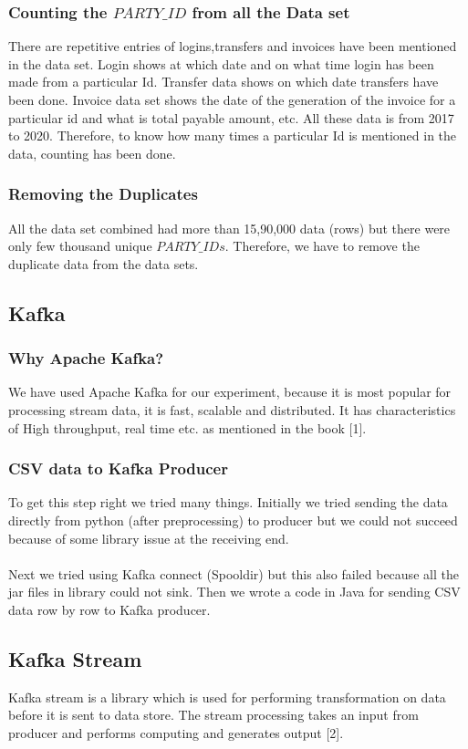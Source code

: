 \documentclass{article}
\begin{document}
\subsubsection{Counting the $PARTY\_ID$ from all the Data set}
There are repetitive entries of logins,transfers and invoices have been mentioned in the data set. Login shows at which date and on what time login has been made from a particular Id. Transfer data shows on which date transfers have been done. Invoice data set shows the date of the generation of the invoice for a particular id and what is total payable amount, etc. All these data is from 2017 to 2020.
Therefore, to know how many times a particular Id is mentioned in the data, counting has been done.

\subsubsection{Removing the Duplicates}
All the data set combined had more than 15,90,000 data (rows) but there were only few thousand unique $PARTY\_IDs$. Therefore, we have to remove the duplicate data from the data sets.


\subsection{Kafka}
\subsubsection{Why Apache Kafka?}
We have used Apache Kafka for our experiment, because it is most popular for processing stream data, it is fast, scalable and distributed. It has characteristics of High throughput, real time etc. as mentioned in the book [1].

\subsubsection{CSV data to Kafka Producer}
To get this step right we tried many things. Initially we tried sending the data directly from python (after preprocessing) to producer but we could not succeed because of some library issue at the receiving end.\\~\\
Next we tried using Kafka connect (Spooldir) but this also failed because all the jar files in library could not sink.
Then we wrote a code in Java for sending CSV data row by row to Kafka producer.

\subsection{Kafka Stream}
Kafka stream is a library which is used for performing transformation on data before it is sent to data store. The stream processing takes an input from producer and performs computing and generates output [2].
\end{document}
